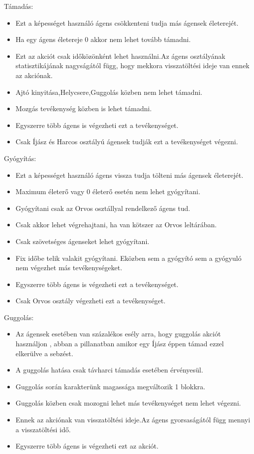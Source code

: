 Támadás:

\begin{itemize}
\item Ezt a képességet használó ágens csökkenteni tudja más ágensek életerejét.
\item Ha egy ágens életereje 0 akkor nem lehet tovább támadni.
\item Ezt az akciót csak időközönként lehet használni.Az ágens osztályának statisztikájának nagyságától függ, hogy mekkora visszatöltési ideje van ennek az akciónak.
\item Ajtó kinyitása,Helycsere,Guggolás közben nem lehet támadni.
\item Mozgás tevékenység közben is lehet támadni. 
\item Egyszerre több ágens is végezheti ezt a tevékenységet.
\item Csak Íjász és Harcos osztályú ágensek tudják ezt a tevékenységet végezni.
\end{itemize}

Gyógyítás:

\begin{itemize}
  \item Ezt a képességet használó ágens vissza tudja tölteni más ágensek életerejét.
  \item Maximum életerő vagy 0 életerő esetén nem lehet gyógyítani.
  \item Gyógyítani csak az Orvos osztállyal rendelkező ágens tud.
  \item Csak akkor lehet végrehajtani, ha van kötszer az Orvos leltárában.
  \item Csak szövetséges ágenseket lehet gyógyítani.
  \item Fix időbe telik valakit gyógyítani. Eközben sem a gyógyító sem a gyógyuló nem végezhet más tevékenységeket. 
  \item Egyszerre több ágens is végezheti ezt a tevékenységet.
  \item Csak Orvos osztály végezheti ezt a tevékenységet.
\end{itemize}

Guggolás:

\begin{itemize}
  \item Az ágensek esetében van százalékos esély arra, hogy guggolás akciót használjon , abban a pillanatban amikor egy Íjász éppen támad ezzel elkerülve a sebzést.
  \item A guggolás hatása csak távharci támadás esetében érvényesül.
  \item Guggolás során karakterünk magassága megváltozik 1 blokkra.
  \item Guggolás közben csak mozogni lehet más tevékenységet nem lehet végezni.
  \item Ennek az akciónak van visszatöltési ideje.Az ágens gyorsaságától függ mennyi a visszatöltési idő.
  \item Egyszerre több ágens is végezheti ezt az akciót.
\end{itemize}

